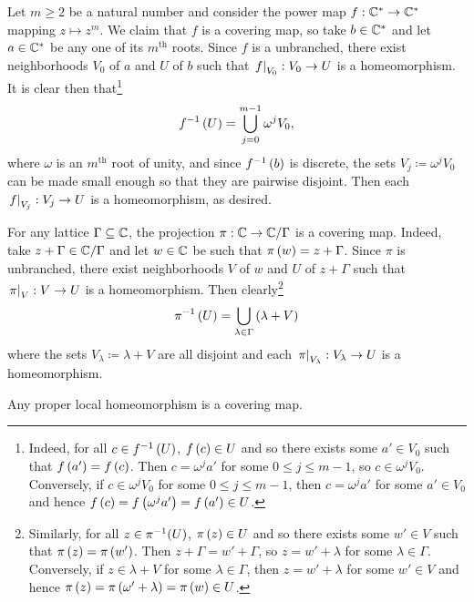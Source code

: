 \documentclass[../Moduli_Spaces_of_Riemann_Surfaces.tex]{subfiles}
\begin{document}
    \begin{example}
        Let $m\geq2$ be a natural number and consider the power map $f:\mathbb{C}^\ast\to\mathbb{C}^\ast$ mapping $z\mapsto z^m$. We claim that $f$ is a covering map, so take $b\in\mathbb{C}^\ast$ and let $a\in\mathbb{C}^\ast$ be any one of its $m^\textrm{th}$ roots. Since $f$ is a unbranched, there exist neighborhoods $V_0$ of $a$ and $U$ of $b$ such that $\left.f\right|_{V_0}:V_0\to U$ is a homeomorphism. It is clear then that\footnote{Indeed, for all $c\in f^{-1}\left(U\right)$, $f\left(c\right)\in U$ and so there exists some $a'\in V_0$ such that $f\left(a'\right)=f\left(c\right)$. Then $c=\omega^ja'$ for some $0\leq j\leq m-1$, so $c\in\omega^jV_0$. Conversely, if $c\in\omega^jV_0$ for some $0\leq j\leq m-1$, then $c=\omega^ja'$ for some $a'\in V_0$ and hence $f\left(c\right)=f\left(\omega^ja'\right)=f\left(a'\right)\in U$.}
        \vspace{-0.05in}
        \begin{equation*}
            f^{-1}\left(U\right)=\bigcup_{j=0}^{m-1}\omega^jV_0,
        \end{equation*}
        where $\omega$ is an $m^\textrm{th}$ root of unity, and since $f^{-1}\left(b\right)$ is discrete, the sets $V_j\coloneqq\omega^jV_0$ can be made small enough so that they are pairwise disjoint. Then each $\left.f\right|_{V_j}:V_j\to U$ is a homeomorphism, as desired.\exqed
    \end{example}
    \begin{example}
        For any lattice $\Gamma\subseteq\mathbb{C}$, the projection $\pi:\mathbb{C}\to\mathbb{C}/\Gamma$ is a covering map. Indeed, take $z+\Gamma\in\mathbb{C}/\Gamma$ and let $w\in\mathbb{C}$ be such that $\pi\left(w\right)=z+\Gamma$. Since $\pi$ is unbranched, there exist neighborhoods $V$ of $w$ and $U$ of $z+\Gamma$ such that $\left.\pi\right|_{V}:V\to U$ is a homeomorphism. Then clearly\footnote{Similarly, for all $z\in\pi^{-1}\!\left(U\right)$, $\pi\left(z\right)\in U$ and so there exists some $w'\in V$ such that $\pi\left(z\right)=\pi\left(w'\right)$. Then $z+\Gamma=w'+\Gamma$, so $z=w'+\lambda$ for some $\lambda\in\Gamma$. Conversely, if $z\in\lambda+V$ for some $\lambda\in\Gamma$, then $z=w'+\lambda$ for some $w'\in V$ and hence $\pi\left(z\right)=\pi\left(\omega'+\lambda\right)=\pi\left(w\right)\in U$.}
        \begin{equation*}
            \pi^{-1}\left(U\right)=\bigcup_{\lambda\in\Gamma}\left(\lambda+V\right)
        \end{equation*}
        where the sets $V_\lambda\coloneqq\lambda+V$ are all disjoint and each $\left.\pi\right|_{V_\lambda}:V_\lambda\to U$ is a homeomorphism.\exqed
    \end{example}
    \begin{proposition}\label{CS:prp:proper_local_covering}
        Any proper local homeomorphism is a covering map.
    \end{proposition}
\end{document}
